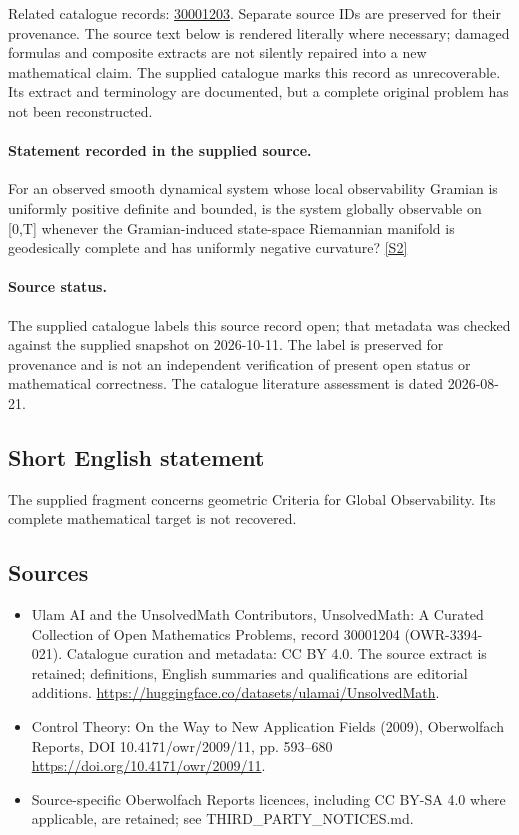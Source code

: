 \documentclass[11pt]{article}
\begin{document}
Related catalogue records: \href{https://mehmetmars7.github.io/Erdosproblems-llm-hunter/problem.html?type=open_problems&id=30001203}{30001203}. Separate source IDs are preserved for their provenance.
The source text below is rendered literally where necessary; damaged formulas and composite extracts are not silently repaired into a new mathematical claim.
The supplied catalogue marks this record as unrecoverable. Its extract and terminology are documented, but a complete original problem has not been reconstructed.
\paragraph{Statement recorded in the supplied source.}
For an observed smooth dynamical system whose local observability Gramian is uniformly positive definite and bounded, is the system globally observable on [0,T] whenever the Gramian-induced state-space Riemannian manifold is geodesically complete and has uniformly negative curvature? \href{https://doi.org/10.4171/owr/2009/11}{[S2]}
\paragraph{Source status.}
The supplied catalogue labels this source record open; that metadata was checked against the supplied snapshot on 2026-10-11. The label is preserved for provenance and is not an independent verification of present open status or mathematical correctness. The catalogue literature assessment is dated 2026-08-21.
\subsection{Short English statement}
The supplied fragment concerns geometric Criteria for Global Observability. Its complete mathematical target is not recovered.
\subsection{Sources}
\begin{itemize}
\item[S1] Ulam AI and the UnsolvedMath Contributors, UnsolvedMath: A Curated Collection of Open Mathematics Problems, record 30001204 (OWR-3394-021). Catalogue curation and metadata: CC BY 4.0. The source extract is retained; definitions, English summaries and qualifications are editorial additions.
\url{https://huggingface.co/datasets/ulamai/UnsolvedMath}.
\item[S2] Control Theory: On the Way to New Application Fields (2009), Oberwolfach Reports, DOI 10.4171/owr/2009/11, pp. 593--680
\url{https://doi.org/10.4171/owr/2009/11}.
\item Source-specific Oberwolfach Reports licences, including CC BY-SA 4.0 where applicable, are retained; see THIRD\_PARTY\_NOTICES.md.
\end{itemize}
\end{document}
